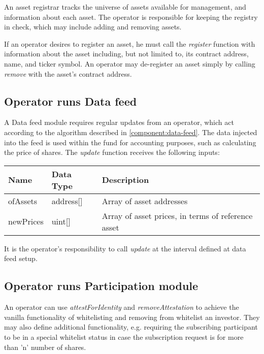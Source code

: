\documentclass[conference]{IEEEtran}
\begin{document}
An asset registrar tracks the universe of assets available for management, and information about each asset.
The operator is responsible for keeping the registry in check, which may include adding and removing assets.

If an operator desires to register an asset, he must call the \textit{register} function with information about the asset including, but not limited to, its contract address, name, and ticker symbol.
An operator may de-register an asset simply by calling \textit{remove} with the asset's contract address.

\subsection{Operator runs Data feed}

A Data feed module requires regular updates from an operator, which act according to the algorithm described in \ref{component:data-feed}.
The data injected into the feed is used within the fund for accounting purposes, such as calculating the price of shares.
The \textit{update} function receives the following inputs:

\begin{center}
		\footnotesize
		\begin{tabular}{ | p{2.7cm} | p{0.8cm} | p{4cm} | }
		\hline
		Name & Data Type & Description \\ \hline
        ofAssets & address[] & Array of asset addresses \\ \hline
        newPrices & uint[] & Array of asset prices, in terms of reference asset \\ \hline
		\end{tabular}
\end{center}

It is the operator's responsibility to call \textit{update} at the interval defined at data feed setup.

\subsection{Operator runs Participation module}

An operator can use \textit{attestForIdentity} and \textit{removeAttestation} to achieve the vanilla functionality of whitelisting and removing from whitelist an investor. They may also define additional functionality, e.g. requiring the subscribing participant to be in a special whitelist status in case the subscription request is for more than 'n' number of shares.
\end{document}
